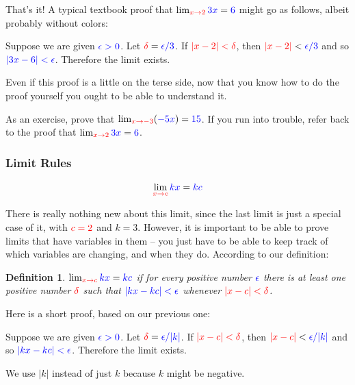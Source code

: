 \documentclass{myarticle}
\newcommand{\hor}[1]{\textcolor{red}{#1}}
\newcommand{\ver}[1]{\textcolor{blue}{#1}}
\theoremstyle{nospace}
\newtheorem*{oldattempt}{Definition}
\newenvironment{attempt}
{\begin{mdframed}\begin{oldattempt}}
    {\end{oldattempt}\end{mdframed}}
\newtheorem{old series theorem}{Theorem}
\newenvironment{series theorem}
{\begin{mdframed}\begin{old series theorem}}
    {\end{old series theorem}\end{mdframed}}
\begin{document}
That's it! A typical textbook proof that
$\lim_{\hor{x \to 2}} \ver{3x} = \ver{6}$ might go as follows, albeit
probably without colors:

\begin{mdframed}
  Suppose we are given $\ver{\epsilon > 0}$. Let $\hor{\delta} =
  \ver{\epsilon/3}$. If $\hor{|x - 2| < \delta}$, then $\hor{|x - 2|}
  < \ver{\epsilon/3}$ and so $\ver{|3x - 6| < \epsilon}$. Therefore
  the limit exists.
\end{mdframed}

Even if this proof is a little on the terse side, now that you know
how to do the proof yourself you ought to be able to understand it.

As an exercise, prove that
$\lim_{\hor{x \to -3}} (\ver{-5x}) = \ver{15}$. If you run into
trouble, refer back to the proof that
$\lim_{\hor{x \to 2}} \ver{3x} = \ver{6}$.

\subsubsection{Limit Rules}
\label{sec:limit rules}

\[
  \lim_{\hor{x \to c}} \ver{kx} = \ver{kc}
\]

There is really nothing new about this limit, since the last limit is
just a special case of it, with $\hor{c = 2}$ and $k = 3$. However, it
is important to be able to prove limits that have variables in them --
you just have to be able to keep track of which variables are
changing, and when they do. According to our definition:

\begin{attempt}
  $\lim_{\hor{x \to c}} \ver{kx} = \ver{kc}$ if for every positive
  number $\ver{\epsilon}$ there is at least one positive number
  $\hor{\delta}$ such that $\ver{|kx - kc| < \epsilon}$ whenever
  $\hor{|x - c| < \delta}$.
\end{attempt}

Here is a short proof, based on our previous one:

\begin{mdframed}
  Suppose we are given $\ver{\epsilon > 0}$. Let $\hor{\delta} =
  \ver{\epsilon/|k|}$. If $\hor{|x - c| < \delta}$, then $\hor{|x -
    c|} < \ver{\epsilon/|k|}$ and so $\ver{|kx - kc| < \epsilon}$.
  Therefore the limit exists.
\end{mdframed}

We use $|k|$ instead of just $k$ because $k$ might be negative.
\end{document}
